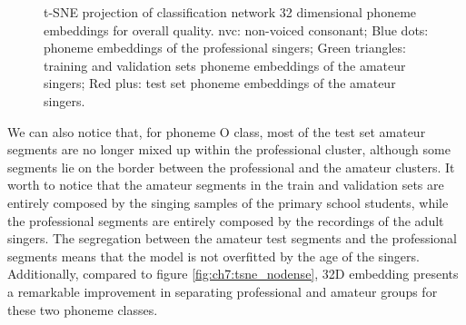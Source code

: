 \begin{figure}[ht!]
        \centering
            
        \caption[]{t-SNE projection of classification network 32 dimensional phoneme embeddings for overall quality. nvc: non-voiced consonant; Blue dots: phoneme embeddings of the professional singers; Green triangles: training and validation sets phoneme embeddings of the amateur singers; Red plus: test set phoneme embeddings of the amateur singers.}
        \label{fig:ch7:tsne_dense}
    \end{figure}

We can also notice that, for phoneme O class, most of the test set amateur segments are no longer mixed up within the professional cluster, although some segments lie on the border between the professional and the amateur clusters. It worth to notice that the amateur segments in the train and validation sets are entirely composed by the singing samples of the primary school students, while the professional segments are entirely composed by the recordings of the adult singers. The segregation between the amateur test segments and the professional segments means that the model is not overfitted by the age of the singers. Additionally, compared to figure \ref{fig:ch7:tsne_nodense}, 32D embedding presents a remarkable improvement in separating professional and amateur groups for these two phoneme classes.

